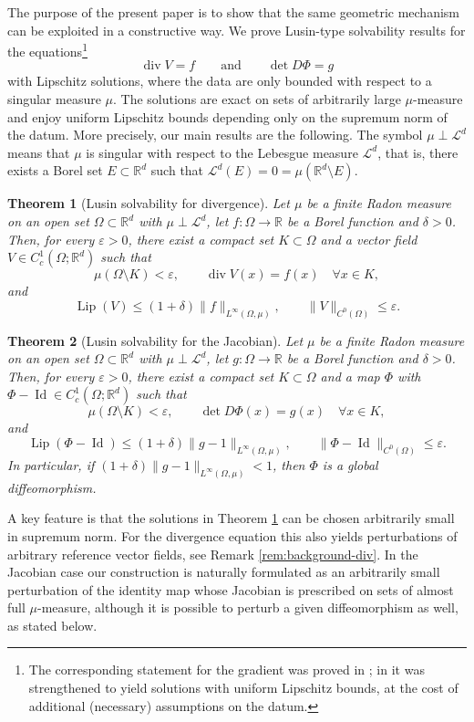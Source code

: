 \documentclass[11pt,a4paper]{article}
\newcommand{\R}{\mathbb{R}}
\newcommand{\LL}{\mathcal{L}}
\newcommand{\diver}{\operatorname{div}}
\newcommand{\Lip}{\operatorname{Lip}}
\newcommand{\Id}{\operatorname{Id}}
\newtheorem{thm}{Theorem}[section]
\theoremstyle{definition}
\theoremstyle{remark}
\begin{document}
The purpose of the present paper is to show that the same geometric mechanism can be exploited in a constructive way.
We prove Lusin-type solvability results for the equations\footnote{The corresponding statement for the gradient was proved in \cite{MS}; in \cite{DMM} it was strengthened to yield solutions with uniform Lipschitz bounds, at the cost of additional (necessary) assumptions on the datum.}
$$
\diver V=f
\qquad\text{and}\qquad
\det D\Phi=g
$$
with Lipschitz solutions, where the data are only bounded with respect to a singular measure $\mu$. 
The solutions are exact on sets of arbitrarily large $\mu$-measure and enjoy uniform Lipschitz bounds depending only on the supremum norm of the datum.
More precisely, our main results are the following. The symbol $\mu\perp\LL^d$ means that $\mu$ is singular with respect to the Lebesgue measure $\LL^d$, that is, there exists a Borel set $E\subset\R^d$ such that $\LL^d(E)=0=\mu(\R^d\setminus E)$. 

\begin{thm}[Lusin solvability for divergence]\label{thm:div}
Let $\mu$ be a finite Radon measure on an open set $\Omega\subset\R^d$ with $\mu\perp\LL^d$, let $f:\Omega\to\R$ be a Borel function and $\delta>0$.
Then, for every $\varepsilon>0$, there exist a compact set $K\subset\Omega$ and a vector field $V\in C^1_c(\Omega;\R^d)$ such that
$$
\mu(\Omega\setminus K)<\varepsilon,
\qquad
\diver V(x)=f(x)\quad\forall x\in K,
$$
and
$$
\Lip(V)\le (1+\delta) \|f\|_{L^\infty(\Omega,\mu)},
\qquad
\|V\|_{C^0(\Omega)}\le \varepsilon.
$$
\end{thm}


\begin{thm}[Lusin solvability for the Jacobian]\label{thm:jac}
Let $\mu$ be a finite Radon measure on an open set $\Omega\subset\R^d$ with $\mu\perp\LL^d$, let $g:\Omega\to\R$ be a Borel function and $\delta>0$.
Then, for every $\varepsilon>0$, there exist a compact set $K\subset\Omega$ and a map $\Phi$ with $\Phi-\Id\in C^1_c(\Omega;\R^d)$ such that
$$
\mu(\Omega\setminus K)<\varepsilon,
\qquad
\det D\Phi(x)=g(x)\quad\forall x\in K,
$$
and
$$
\Lip(\Phi-\Id)\le (1+\delta)\|g-1\|_{L^\infty(\Omega,\mu)},
\qquad
\|\Phi-\Id\|_{C^0(\Omega)}\le \varepsilon.
$$
In particular, if $(1+\delta)\|g-1\|_{L^\infty(\Omega,\mu)}< 1$, then $\Phi$ is a global diffeomorphism.
\end{thm}


A key feature is that the solutions in Theorem \ref{thm:div} can be chosen arbitrarily small in supremum norm.
For the divergence equation this also yields perturbations of arbitrary reference vector fields, see Remark \ref{rem:background-div}.
In the Jacobian case our construction is naturally formulated as an arbitrarily small perturbation of the identity map whose Jacobian is prescribed on sets of almost full $\mu$-measure, although it is possible to perturb a given diffeomorphism as well, as stated below.
\end{document}
